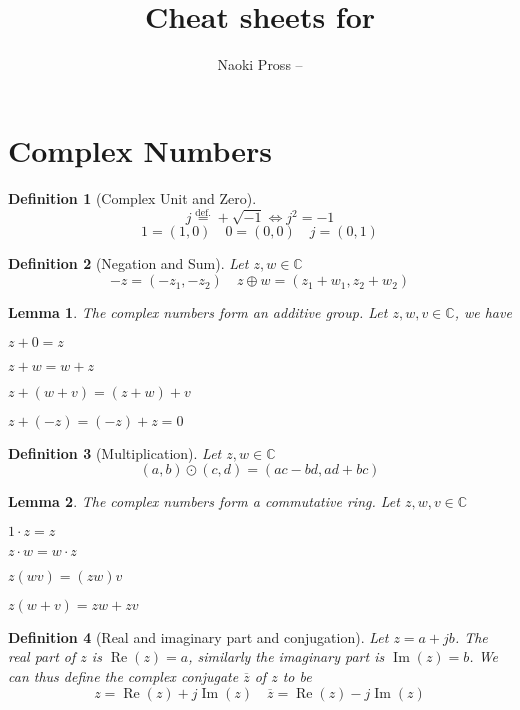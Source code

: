 \documentclass[twocolumn, margin=small]{tex/hsrzf}
\author{Naoki Pross -- \texttt{\theauthoremail}}
\title{Cheat sheets for \texttt{\themodule}}
\date{\thesemester}
\newcommand\defeq{\overset{\mathrm{def.}}{=}}
\newcommand\Cset{\mathbb{C}}
\newcommand\conj[1]{\overline{#1}}
\renewcommand\Re{\operatorname{Re}}
\renewcommand\Im{\operatorname{Im}}
\theoremstyle{komfourzf}
\newtheorem{definition}{Definition}
\newtheorem{lemma}{Lemma}
\begin{document}
\section{Complex Numbers}

\begin{definition}[Complex Unit and Zero]
  \[
    j \defeq +\sqrt{-1} \iff j^2 = -1
  \]
  \[
    1 = (1,0) \quad 0 = (0,0) \quad j = (0,1)
  \]
\end{definition}

\begin{definition}[Negation and Sum] Let \(z, w \in \Cset\)
\[
  -z = (-z_1, -z_2) \quad
  z \oplus w =  (z_1 + w_1, z_2 + w_2)
\]
\end{definition}

\begin{lemma}
  The complex numbers form an additive group. Let \(z, w, v \in \Cset\), we have
  \begin{description}[leftmargin=3cm]
    \item[Identity] \(z + 0 = z\)
    \item[Commutativity] \(z + w = w + z\)
    \item[Associativity] \(z + (w + v) = (z + w) + v\)
    \item[Inverse property] \(z + (-z) = (-z) + z = 0\)
  \end{description}
\end{lemma}

\begin{definition}[Multiplication] Let \(z, w \in \Cset\)
  \[
    (a,b) \odot (c,d) = (ac - bd, ad + bc)
  \]
\end{definition}

\begin{lemma} The complex numbers form a commutative ring. Let \(z,w,v \in\Cset\)
  \begin{description}[leftmargin=3cm]
    \item[Identity] \(1\cdot z = z\)
    \item[Commutativity] \(z \cdot w = w \cdot z\)
    \item[Associativity] \(z (w v) = (z w) v\)
    \item[Distributivity] \(z (w + v) = zw + zv\)
  \end{description}
\end{lemma}

\begin{definition}[Real and imaginary part and conjugation]
  Let \(z = a + jb\). The \emph{real} part of \(z\) is \(\Re(z) = a\), similarly the \emph{imaginary} part is \(\Im(z) = b\). We can thus define the \emph{complex conjugate} \(\conj{z}\) of \(z\) to be
  \[
    z = \Re(z) + j\Im(z)
    \quad
    \conj{z} = \Re(z) - j\Im(z)
  \]
\end{definition}
\end{document}
